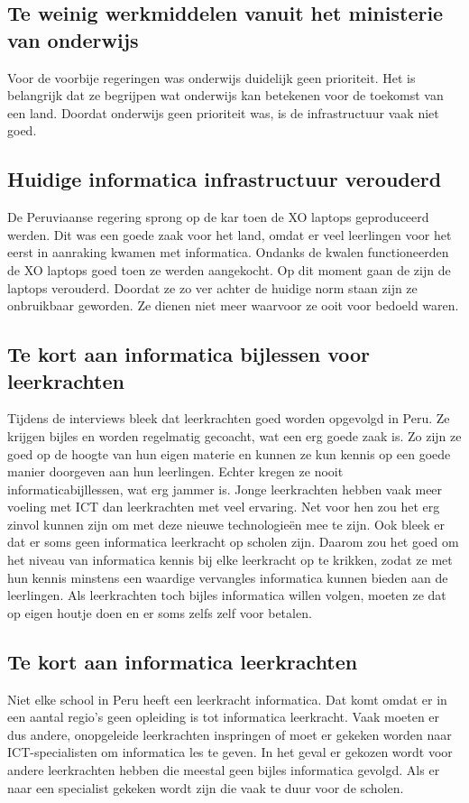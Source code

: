 \subsection{Te weinig werkmiddelen vanuit het ministerie van onderwijs}
Voor de voorbije regeringen was onderwijs duidelijk geen prioriteit. Het is belangrijk dat ze begrijpen wat onderwijs kan betekenen voor de toekomst van een land. Doordat onderwijs geen prioriteit was, is de infrastructuur vaak niet goed. 

\subsection{Huidige informatica infrastructuur verouderd}
De Peruviaanse regering sprong op de kar toen de XO laptops geproduceerd werden. Dit was een goede zaak voor het land, omdat er veel leerlingen voor het eerst in aanraking kwamen met informatica. Ondanks de kwalen functioneerden de XO laptops goed toen ze werden aangekocht. Op dit moment gaan de zijn de laptops verouderd. Doordat ze zo ver achter de huidige norm staan zijn ze onbruikbaar geworden. Ze dienen niet meer waarvoor ze ooit voor bedoeld waren.

\subsection{Te kort aan informatica bijlessen voor leerkrachten}
Tijdens de interviews bleek dat leerkrachten goed worden opgevolgd in Peru. Ze krijgen bijles en worden regelmatig gecoacht, wat een erg goede zaak is. Zo zijn ze goed op de hoogte van hun eigen materie en kunnen ze kun kennis op een goede manier doorgeven aan hun leerlingen. Echter kregen ze nooit informaticabijllessen, wat erg jammer is. Jonge leerkrachten hebben vaak meer voeling met ICT dan leerkrachten met veel ervaring. Net voor hen zou het erg zinvol kunnen zijn om met deze nieuwe technologieën mee te zijn. Ook bleek er dat er soms geen informatica leerkracht op scholen zijn. Daarom zou het goed om het niveau van informatica kennis bij elke leerkracht op te krikken, zodat ze met hun kennis minstens een waardige vervangles informatica kunnen bieden aan de leerlingen. Als leerkrachten toch bijles informatica willen volgen, moeten ze dat op eigen houtje doen en er soms zelfs zelf voor betalen.

\subsection{Te kort aan informatica leerkrachten}
Niet elke school in Peru heeft een leerkracht informatica. Dat komt omdat er in een aantal regio's geen opleiding is tot informatica leerkracht. Vaak moeten er dus andere, onopgeleide leerkrachten inspringen of moet er gekeken worden naar ICT-specialisten om informatica les te geven. In het geval er gekozen wordt voor andere leerkrachten hebben die meestal geen bijles informatica gevolgd. Als er naar een specialist gekeken wordt zijn die vaak te duur voor de scholen. 


